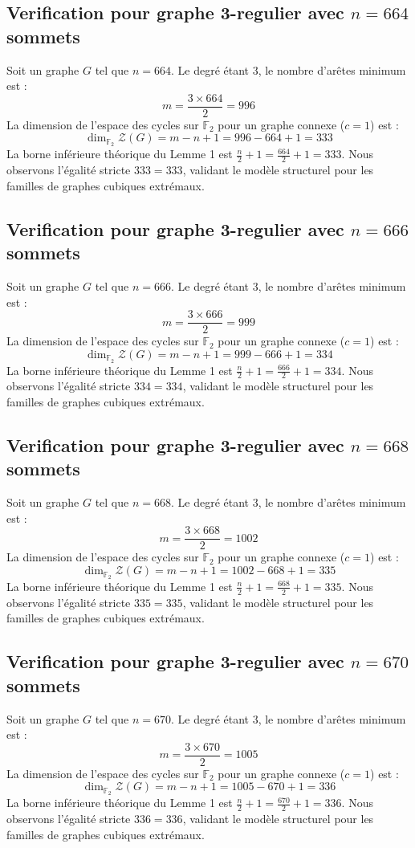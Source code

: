 \documentclass[11pt,a4paper]{article}
\begin{document}
\subsection{Verification pour graphe 3-regulier avec $n=664$ sommets}
Soit un graphe $G$ tel que $n = 664$. Le degré étant 3, le nombre d'arêtes minimum est :
$$ m = \frac{3 \times 664}{2} = 996 $$
La dimension de l'espace des cycles sur $\mathbb{F}_2$ pour un graphe connexe ($c=1$) est :
$$ \dim_{\mathbb{F}_2} \mathcal{Z}(G) = m - n + 1 = 996 - 664 + 1 = 333 $$
La borne inférieure théorique du Lemme 1 est $\frac{n}{2} + 1 = \frac{664}{2} + 1 = 333$.
Nous observons l'égalité stricte $333 = 333$, validant le modèle structurel pour les familles de graphes cubiques extrémaux.

\subsection{Verification pour graphe 3-regulier avec $n=666$ sommets}
Soit un graphe $G$ tel que $n = 666$. Le degré étant 3, le nombre d'arêtes minimum est :
$$ m = \frac{3 \times 666}{2} = 999 $$
La dimension de l'espace des cycles sur $\mathbb{F}_2$ pour un graphe connexe ($c=1$) est :
$$ \dim_{\mathbb{F}_2} \mathcal{Z}(G) = m - n + 1 = 999 - 666 + 1 = 334 $$
La borne inférieure théorique du Lemme 1 est $\frac{n}{2} + 1 = \frac{666}{2} + 1 = 334$.
Nous observons l'égalité stricte $334 = 334$, validant le modèle structurel pour les familles de graphes cubiques extrémaux.

\subsection{Verification pour graphe 3-regulier avec $n=668$ sommets}
Soit un graphe $G$ tel que $n = 668$. Le degré étant 3, le nombre d'arêtes minimum est :
$$ m = \frac{3 \times 668}{2} = 1002 $$
La dimension de l'espace des cycles sur $\mathbb{F}_2$ pour un graphe connexe ($c=1$) est :
$$ \dim_{\mathbb{F}_2} \mathcal{Z}(G) = m - n + 1 = 1002 - 668 + 1 = 335 $$
La borne inférieure théorique du Lemme 1 est $\frac{n}{2} + 1 = \frac{668}{2} + 1 = 335$.
Nous observons l'égalité stricte $335 = 335$, validant le modèle structurel pour les familles de graphes cubiques extrémaux.

\subsection{Verification pour graphe 3-regulier avec $n=670$ sommets}
Soit un graphe $G$ tel que $n = 670$. Le degré étant 3, le nombre d'arêtes minimum est :
$$ m = \frac{3 \times 670}{2} = 1005 $$
La dimension de l'espace des cycles sur $\mathbb{F}_2$ pour un graphe connexe ($c=1$) est :
$$ \dim_{\mathbb{F}_2} \mathcal{Z}(G) = m - n + 1 = 1005 - 670 + 1 = 336 $$
La borne inférieure théorique du Lemme 1 est $\frac{n}{2} + 1 = \frac{670}{2} + 1 = 336$.
Nous observons l'égalité stricte $336 = 336$, validant le modèle structurel pour les familles de graphes cubiques extrémaux.
\end{document}
